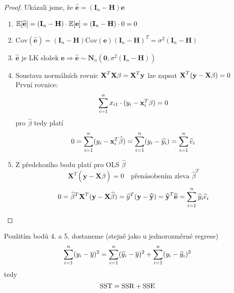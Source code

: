 \begin{proof}
Ukázali jsme, že $ \widehat{\textbf{e}} = ( \textbf{I}_n - \textbf{H} ) \textbf{e} $
\begin{enumerate}
\item $ \mathbb{E} [ \widehat{\textbf{e}} ] = ( \textbf{I}_n - \textbf{H} ) \cdot \mathbb{E} [ \textbf{e} ] = ( \textbf{I}_n - \textbf{H} ) \cdot 0 = 0 $
\item $ \text{Cov}( \widehat{\textbf{e}} ) = ( \textbf{I}_n - \textbf{H} ) \text{Cov}( \textbf{e} ) ( \textbf{I}_n - \textbf{H} )^{T} = \sigma^{2} ( \textbf{I}_n - \textbf{H} ) $
\item $ \widehat{\textbf{e}} $ je LK složek $ \textbf{e}  \Rightarrow  \widehat{\textbf{e}} \sim \textbf{N}_n ( \textbf{0} , \sigma^{2} ( \textbf{I}_n - \textbf{H} ) ) $
\item Soustava normálních rovnic $ \textbf{X} ^{T} \textbf{X} \beta = \textbf{X} ^{T} \textbf{y} $ lze zapsat $ \textbf{X} ^{T} ( \textbf{y} - \textbf{X} \beta ) = 0 $ \\
První rovnice: 
$$
 \sum\limits_{i=1}^{n} x_{i1} \cdot ( y_i - \textbf{x}_i^{T} \beta ) = 0
$$
pro $ \widehat{\beta} $ tedy platí 
$$
 0 = \sum\limits_{i=1}^{n} ( y_i - \textbf{x}_i^{T} \widehat{\beta} ) = \sum\limits_{i=1}^{n} ( y_i - \widehat{y_i} ) = \sum\limits_{i=1}^{n} \widehat{e}_i 
$$
\item Z předchozího bodu platí pro OLS $ \widehat{\beta} $ 
$$
 \textbf{X}^{T} ( \textbf{y} - \textbf{X} \widehat{\beta} ) = 0 \quad \text{přenásobením zleva } \widehat{\beta}^{T}
$$
$$
  0 = \widehat{\beta}^{T} \textbf{X}^{T} ( \textbf{y} - \textbf{X} \widehat{\beta} ) = \widehat{y}^{T} ( \textbf{y} - \widehat{\textbf{y}} ) = \widehat{\textbf{y}}^{T} \widehat{\textbf{e}} = \sum\limits_{i=1}^{n} \widehat{y}_i \widehat{e}_i
$$
\end{enumerate}
\end{proof}
Použitím bodů 4. a 5. dostaneme (stejně jako u jednorozměrné regrese)
$$
  \sum\limits_{i=1}^{n} ( y_i - \overline{y} )^{2} = \sum\limits_{i=1}^{n} ( \widehat{y}_i - \overline{y} )^{2} + \sum\limits_{i=1}^{n} ( y_i - \widehat{y}_i )^{2}
$$
tedy
$$
 \mathrm{SST} = \mathrm{SSR} + \mathrm{SSE}
$$